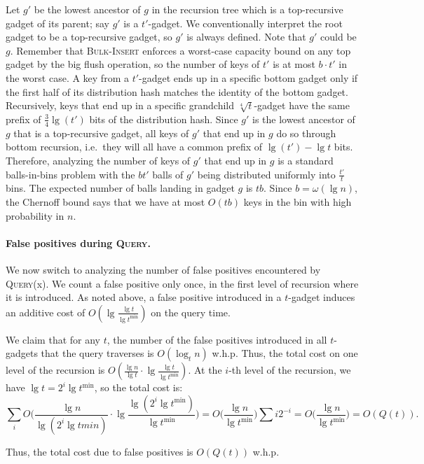 \documentclass[letterpaper,11pt]{article}
\newcommand{\proc}[1]{\textnormal{\scshape#1}}
\newcommand{\tmin}{t^{\min}}
\begin{document}
Let $g'$ be the lowest ancestor of $g$ in the recursion tree which is
a top-recursive gadget of its parent; say $g'$ is a $t'$-gadget. We
conventionally interpret the root gadget to be a top-recursive gadget,
so $g'$ is always defined. Note that $g'$ could be $g$. Remember that
\proc{Bulk-Insert} enforces a worst-case capacity bound on any top
gadget by the big flush operation, so the number of keys of $t'$ is at
most $b\cdot t'$ in the worst case. A key from a $t'$-gadget ends up
in a specific bottom gadget only if the first half of its distribution
hash matches the identity of the bottom gadget. Recursively, keys that
end up in a specific grandchild $\sqrt[4]{t}$-gadget have the same
prefix of $\frac{3}{4} \lg (t')$ bits of the distribution hash. Since
$g'$ is the lowest ancestor of $g$ that is a top-recursive gadget, all
keys of $g'$ that end up in $g$ do so through bottom recursion,
i.e.~they will all have a common prefix of $\lg(t') - \lg t$ bits.
Therefore, analyzing the number of keys of $g'$ that end up in $g$ is
a standard balls-in-bins problem with the $bt'$ balls of $g'$ being
distributed uniformly into $\frac{t'}{t}$ bins. The expected number of
balls landing in gadget $g$ is $tb$. Since $b = \omega(\lg n)$, the
Chernoff bound says that we have at most $O(tb)$ keys in the bin with
high probability in $n$.


\paragraph{False positives during \proc{Query}.}
We now switch to analyzing the number of false positives encountered
by \proc{Query}(x).  We count a false positive only once, in the first
level of recursion where it is introduced. As noted above, a false
positive introduced in a $t$-gadget induces an additive cost of
$O(\lg\frac{\lg t}{\lg \tmin})$ on the query time.

We claim that for any $t$, the number of the false positives
introduced in all $t$-gadgets that the query traverses is $O(\log_t
n)$ w.h.p. Thus, the total cost on one level of the recursion is
$O(\frac{\lg n}{\lg t} \cdot \lg\frac{\lg t}{\lg \tmin})$. At the
$i$-th level of the recursion, we have $\lg t = 2^i\lg \tmin$, so the
total cost is:
\[ \sum_i O\Big( \frac{\lg n}{\lg(2^i \lg tmin)} \cdot
                  \lg\frac{\lg(2^i \lg\tmin)}{\lg \tmin} \Big) 
= O\Big(\frac{\lg n}{\lg \tmin} \Big) \sum i 2^{-i} 
= O\Big( \frac{\lg n}{\lg \tmin} \Big)
= O(Q(t)).\]

Thus, the total cost due to false positives is $O(Q(t))$ w.h.p.
\end{document}
